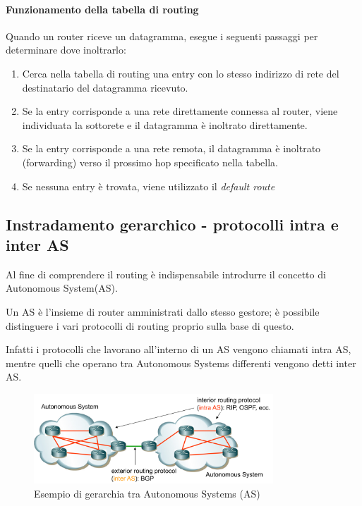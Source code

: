 \paragraph{Funzionamento della tabella di routing}

Quando un router riceve un datagramma, esegue i seguenti passaggi per determinare dove inoltrarlo:
\begin{enumerate}
    \item Cerca nella tabella di routing una entry con lo stesso indirizzo di rete del destinatario del datagramma ricevuto.
    \item Se la entry corrisponde a una rete direttamente connessa al router, viene individuata la sottorete e il datagramma è inoltrato direttamente.
    \item Se la entry corrisponde a una rete remota, il datagramma è inoltrato (forwarding) verso il prossimo hop specificato nella tabella.
    \item Se nessuna entry è trovata, viene utilizzato il \textit{default route}
\end{enumerate}

\newpage

\subsection{Instradamento gerarchico - protocolli intra e inter AS}
Al fine di comprendere il routing è indispensabile introdurre il concetto di Autonomous System(AS).

Un AS è l'insieme di router amministrati dallo stesso gestore; è possibile distinguere i vari protocolli di routing proprio sulla base di questo.

Infatti i protocolli che lavorano all'interno di un AS vengono chiamati intra AS, mentre quelli che operano tra Autonomous Systems differenti vengono detti inter AS.

\begin{figure}[h!]
    \centering
    \includegraphics[width=0.8\textwidth]{images/asgerarchia.png}
    \caption{Esempio di gerarchia tra Autonomous Systems (AS)}
    \label{fig:asgerarchia}
\end{figure}

